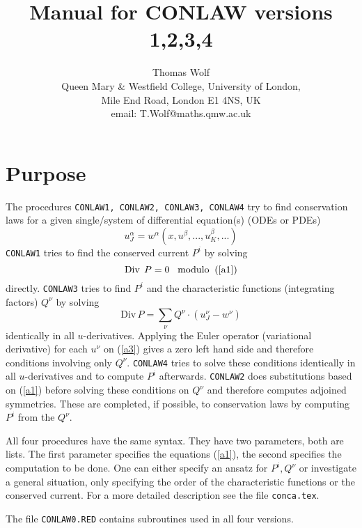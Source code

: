 \documentclass[12pt]{article}
\title{Manual for CONLAW versions 1,2,3,4}
\author{Thomas Wolf\\ Queen Mary \& Westfield College, University of London, \\
     Mile End Road, London E1 4NS, UK \\  email: T.Wolf@maths.qmw.ac.uk}
\begin{document}
\maketitle
\section{Purpose}
The procedures {\tt CONLAW1, CONLAW2, CONLAW3, CONLAW4} 
try to find conservation laws
for a given single/system of differential equation(s) (ODEs or PDEs)
\begin{equation}
     u^{\alpha}_J = w^{\alpha}(x,u^{\beta},...,u^{\beta}_K,...)  \label{a1}
\end{equation}
{\tt CONLAW1} tries to find the conserved current $P^i$ by solving
\begin{equation}
   \mbox{Div}\;\,P = 0  \;\;\; \mbox{modulo}\;\; (\ref{a1})
\label{a2}
\end{equation}
directly. {\tt CONLAW3} tries to find $P^i$ and the characteristic
functions (integrating factors) $Q^{\nu}$ by solving
\begin{equation}
\mbox{Div}\,P = \sum_{\nu} Q^{\nu}\cdot (u^{\nu}_J - w^{\nu}) \label{a3}
\end{equation}
identically in all $u$-derivatives.
Applying the Euler operator (variational derivative) for each $u^{\nu}$
on (\ref{a3}) gives a zero left hand side and therefore
conditions involving only $Q^{\nu}$. {\tt CONLAW4} tries to solve these
conditions identically in all $u$-derivatives and to compute $P^i$
afterwards. {\tt CONLAW2}
does substitutions based on (\ref{a1}) before solving these
conditions on $Q^{\nu}$
and therefore computes adjoined symmetries. These are
completed, if possible, to conservation laws by computing $P^i$ from
the $Q^{\nu}$.

All four procedures have the same syntax. They have two parameters,
both are lists. The first parameter specifies the equations (\ref{a1}), 
the second specifies the computation to be done. One can either specify an 
ansatz for $P^i, Q^{\nu}$ or investigate a general situation, only specifying 
the order of the characteristic functions or the conserved current. For a 
more detailed description see the file {\tt conca.tex}.

The file {\tt CONLAW0.RED} contains subroutines used in all four versions.
\end{document}
